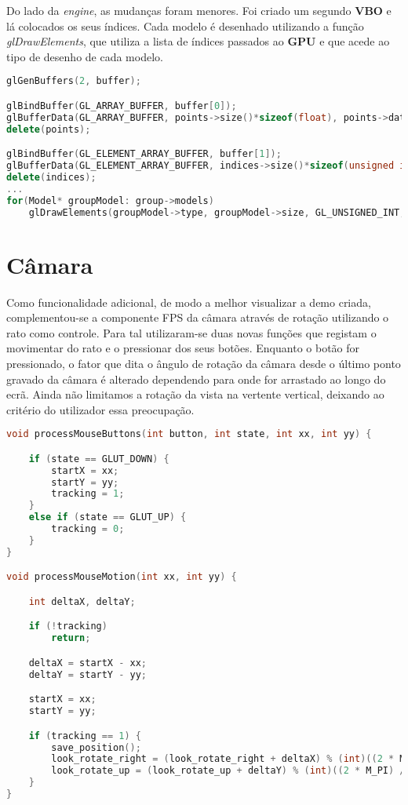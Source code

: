 \documentclass[14pt, a4 paper]{report}
\begin{document}
Do lado da \textit{engine}, as mudanças foram menores. Foi criado um segundo \textbf{VBO} e lá colocados os seus índices. Cada modelo é desenhado utilizando a função \textit{glDrawElements}, que utiliza a lista de índices passados ao \textbf{GPU} e que acede ao tipo de desenho de cada modelo.

\begin{lstlisting}[language = c++]
glGenBuffers(2, buffer);

glBindBuffer(GL_ARRAY_BUFFER, buffer[0]);
glBufferData(GL_ARRAY_BUFFER, points->size()*sizeof(float), points->data(), GL_STATIC_DRAW);
delete(points);

glBindBuffer(GL_ELEMENT_ARRAY_BUFFER, buffer[1]);
glBufferData(GL_ELEMENT_ARRAY_BUFFER, indices->size()*sizeof(unsigned int), indices->data(), GL_STATIC_DRAW);
delete(indices);
...
for(Model* groupModel: group->models)
    glDrawElements(groupModel->type, groupModel->size, GL_UNSIGNED_INT, (void*) (groupModel->index * sizeof(GLuint)));
\end{lstlisting}

\section{Câmara}

Como funcionalidade adicional, de modo a melhor visualizar a demo criada, complementou-se a componente FPS da câmara através de rotação utilizando o rato como controle. Para tal utilizaram-se duas novas funções que registam o movimentar do rato e o pressionar dos seus botões. Enquanto o botão for pressionado, o fator que dita o ângulo de rotação da câmara desde o último ponto gravado da câmara é alterado dependendo para onde for arrastado ao longo do ecrã. Ainda não limitamos a rotação da vista na vertente vertical, deixando ao critério do utilizador essa preocupação.

\begin{lstlisting}[language = c++]
void processMouseButtons(int button, int state, int xx, int yy) {

	if (state == GLUT_DOWN) {
		startX = xx;
		startY = yy;
		tracking = 1;
	}
	else if (state == GLUT_UP) {
		tracking = 0;
	}
}

void processMouseMotion(int xx, int yy) {

	int deltaX, deltaY;

	if (!tracking)
		return;

	deltaX = startX - xx;
	deltaY = startY - yy;

	startX = xx;
	startY = yy;

	if (tracking == 1) {
		save_position();
		look_rotate_right = (look_rotate_right + deltaX) % (int)((2 * M_PI) / look_rotate_delta_right + 1);
		look_rotate_up = (look_rotate_up + deltaY) % (int)((2 * M_PI) / look_rotate_delta_up + 1);
	}
}
\end{lstlisting}
\end{document}
